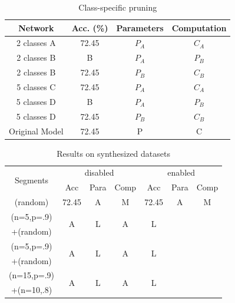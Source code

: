 \documentclass[pageno]{jpaper}
\begin{document}
\begin{table}
    \caption{Class-specific pruning}
    \label{tab:csPruning}

    \centering
    \begin{tabular}{ c|c|cc } 
     \hline
     Network & Acc. (\%) & Parameters & Computation \\ 
     \hline
     2 classes A & 72.45 & $P_A$ & $C_A$ \\
     2 classes B & B & $P_A$ & $P_B$ \\
     2 classes B & 72.45 & $P_B$ & $C_B$ \\
     \hline
     5 classes C & 72.45 & $P_A$ & $C_A$ \\
     5 classes D & B & $P_A$ & $P_B$ \\
     5 classes D & 72.45 & $P_B$ & $C_B$ \\
     \hline
     Original Model & 72.45 & P & C \\
     \hline
    \end{tabular}
\end{table}





\begin{table}
    \centering
    \begin{tabular}{c|ccc|ccc}
    \hline
    \multirow{2}{*}{Segments} & \multicolumn{3}{c|}{disabled} &  \multicolumn{3}{c}{enabled}\\
        & Acc & Para & Comp & Acc & Para & Comp    \\
    \hline
    (random)      & 72.45 & A & M & 72.45 & A & M \\
    \hline
    (n=5,p=.9)      & \multirow{2}{*}{A} & \multirow{2}{*}{L} & \multirow{2}{*}{A} & \multirow{2}{*}{L} \\
    +(random) & & & & \\
    \hline
    (n=5,p=.9)      & \multirow{2}{*}{A} & \multirow{2}{*}{L} & \multirow{2}{*}{A} & \multirow{2}{*}{L} \\
    +(random) & & & & \\
    
    \hline
    (n=15,p=.9)      & \multirow{2}{*}{A} & \multirow{2}{*}{L} & \multirow{2}{*}{A} & \multirow{2}{*}{L} \\
    +(n=10,.8) & & & & \\
    \hline

    
    \end{tabular}
    \caption{Results on synthesized datasets}
    \label{tab:synthe}
\end{table}
\end{document}
